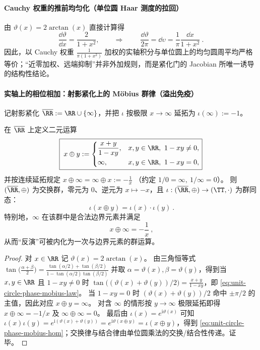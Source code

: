 \paragraph{Cauchy 权重的推前均匀化（单位圆 Haar 测度的拉回）}
由 \(\vartheta(x)=2\arctan(x)\) 直接计算得
\[
\frac{\dd\vartheta}{\dd x}=\frac{2}{1+x^{2}},
\qquad\Longrightarrow\qquad
\boxed{\ \frac{\dd\vartheta}{2\pi}=\dd\upsilon=\frac{1}{\pi}\frac{\dd x}{1+x^{2}}\ }.
\]
因此，以 Cauchy 权重 \(\frac{1}{\pi(1+x^{2})}\) 加权的实轴积分与单位圆上的均匀圆周平均严格等价；“近零加权、远端抑制”并非外加规则，而是紧化门的 Jacobian 所唯一诱导的结构性结论。

\paragraph{实轴上的相位相加：射影紧化上的 Möbius 群律（溢出免疫）}
记射影紧化 \(\overline{\RR}:=\RR\cup\{\infty\}\)，并把 \(\iota\) 按极限 \(x\to\infty\) 延拓为 \(\iota(\infty):=-1\)。
\begin{proposition}\label{prop:unit-circle-phase-mobius-law}
在 \(\overline{\RR}\) 上定义二元运算
\begin{equation}\label{eq:unit-circle-phase-mobius-law}
\boxed{\;
x\oplus y:=
\begin{cases}
\dfrac{x+y}{1-xy}, & x,y\in\RR,\ 1-xy\neq 0,\\[6pt]
\infty, & x,y\in\RR,\ 1-xy=0,
\end{cases}
}
\end{equation}
并按连续延拓规定
\(
x\oplus \infty=\infty\oplus x:=-\frac{1}{x}
\)
（约定 \(1/0=\infty,\ 1/\infty=0\)）。
则 \((\overline{\RR},\oplus)\) 为交换群，零元为 \(0\)、逆元为 \(x\mapsto -x\)，且 \(\iota:(\overline{\RR},\oplus)\to(\TT,\cdot)\) 为群同态：
\begin{equation}\label{eq:unit-circle-phase-mobius-hom}
\boxed{\ \iota(x\oplus y)=\iota(x)\cdot\iota(y)\ }.
\end{equation}
特别地，\(\infty\) 在该群中是合法边界元素并满足
\begin{equation}\label{eq:unit-circle-phase-inversion-as-translation}
\boxed{\ x\oplus\infty=-\frac1x\ },
\end{equation}
从而“反演”可被内化为一次与边界元素的群运算。
\end{proposition}
\begin{proof}
对 \(x\in\RR\) 记 \(\vartheta(x)=2\arctan(x)\)。
由三角恒等式
\(
\tan\!\bigl(\frac{\alpha+\beta}{2}\bigr)=\frac{\tan(\alpha/2)+\tan(\beta/2)}{1-\tan(\alpha/2)\tan(\beta/2)}
\)
并取 \(\alpha=\vartheta(x),\beta=\vartheta(y)\)，得到当 \(x,y\in\RR\) 且 \(1-xy\neq 0\) 时
\(
\tan\!\bigl((\vartheta(x)+\vartheta(y))/2\bigr)=\frac{x+y}{1-xy}
\)，即 \eqref{eq:unit-circle-phase-mobius-law}。
当 \(1-xy=0\) 时 \((\vartheta(x)+\vartheta(y))/2\) 命中 \(\pm\pi/2\) 的主值，因此对应 \(x\oplus y=\infty\)。
对含 \(\infty\) 的情形按 \(y\to\infty\) 极限延拓即得 \(x\oplus\infty=-1/x\) 及 \(\infty\oplus\infty=0\)。
最后由
\(
\iota(x)=e^{\mathrm{i}\vartheta(x)}
\)
可知
\(
\iota(x)\iota(y)=e^{\mathrm{i}(\vartheta(x)+\vartheta(y))}=e^{\mathrm{i}\vartheta(x\oplus y)}=\iota(x\oplus y)
\)，得到 \eqref{eq:unit-circle-phase-mobius-hom}；交换律与结合律由单位圆乘法的交换/结合性传递。证毕。
\end{proof}

